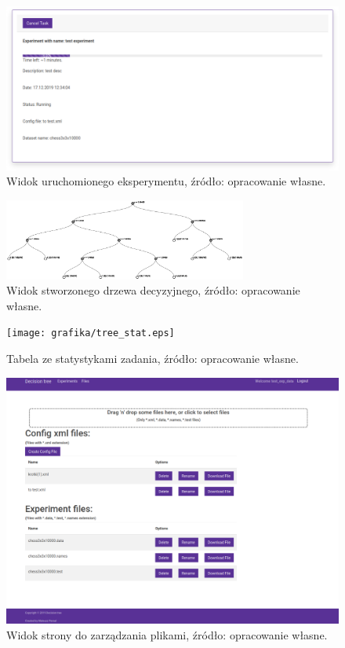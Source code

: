\begin{figure}[htb]
	\centering
	\includegraphics[width=15cm]{grafika/progress_bar.eps}
	\caption{Widok uruchomionego eksperymentu, źródło: opracowanie własne.}
	\label{rys15_progress_bar}
\end{figure}

\begin{figure}[htb]
	\centering
	\includegraphics[angle=270, width=8cm]{grafika/tree_veiw.eps}
	\caption{Widok stworzonego drzewa decyzyjnego, źródło: opracowanie własne.}
	\label{rys16_tree_veiw}
\end{figure}

\begin{figure}[htb]
	\centering
	\texttt{[image: grafika/tree\_stat.eps]}
	\caption{Tabela ze statystykami zadania, źródło: opracowanie własne.}
	\label{rys22_tree_stat}
\end{figure}

\begin{figure}[htb]
	\centering
	\includegraphics[width=15cm]{grafika/file_page.eps}
	\caption{Widok strony do zarządzania plikami, źródło: opracowanie własne.}
	\label{rys17_file_page}
\end{figure}

